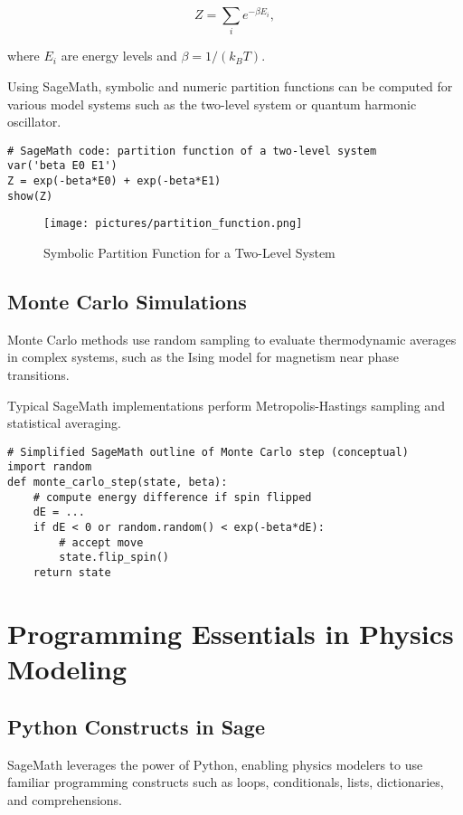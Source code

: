 \documentclass[12pt]{book}
\begin{document}
\[
Z = \sum_i e^{-\beta E_i},
\]

where \(E_i\) are energy levels and \(\beta = 1/(k_B T)\).

Using SageMath, symbolic and numeric partition functions can be computed for various model systems such as the two-level system or quantum harmonic oscillator.

\begin{verbatim}
# SageMath code: partition function of a two-level system
var('beta E0 E1')
Z = exp(-beta*E0) + exp(-beta*E1)
show(Z)
\end{verbatim}

\begin{figure}[H]
  \centering
  \texttt{[image: pictures/partition\_function.png]}
  \caption{Symbolic Partition Function for a Two-Level System}
  \label{fig:partition_function}
\end{figure}

\section{Monte Carlo Simulations}

Monte Carlo methods use random sampling to evaluate thermodynamic averages in complex systems, such as the Ising model for magnetism near phase transitions.

Typical SageMath implementations perform Metropolis-Hastings sampling and statistical averaging.

\begin{verbatim}
# Simplified SageMath outline of Monte Carlo step (conceptual)
import random
def monte_carlo_step(state, beta):
    # compute energy difference if spin flipped
    dE = ...
    if dE < 0 or random.random() < exp(-beta*dE):
        # accept move
        state.flip_spin()
    return state
\end{verbatim}

\chapter{Programming Essentials in Physics Modeling}

\section{Python Constructs in Sage}

SageMath leverages the power of Python, enabling physics modelers to use familiar programming constructs such as loops, conditionals, lists, dictionaries, and comprehensions.
\end{document}
